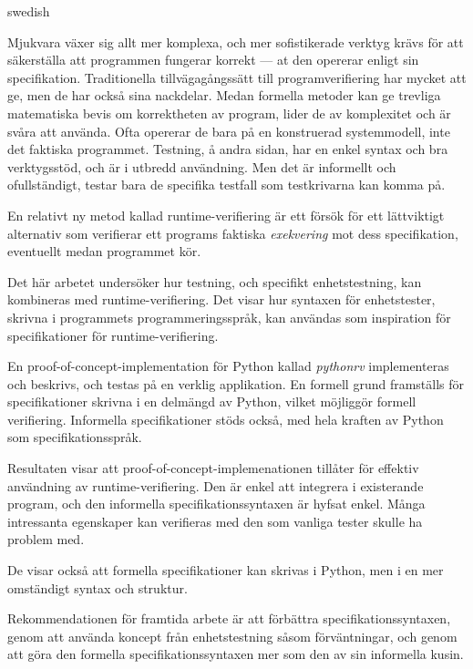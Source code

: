 \documentclass[a4paper,11pt]{kth-mag}
\begin{document}
\begin{foreignabstract}{swedish}

Mjukvara växer sig allt mer komplexa, och mer sofistikerade verktyg
krävs för att säkerställa att programmen fungerar korrekt --- at den opererar
enligt sin specifikation. Traditionella tillvägagångssätt till
programverifiering har mycket att ge, men de har också sina nackdelar. Medan
formella metoder kan ge trevliga matematiska bevis om korrektheten av program,
lider de av komplexitet och är svåra att använda. Ofta opererar de bara på en
konstruerad systemmodell, inte det faktiska programmet. Testning, å andra
sidan, har en enkel syntax och bra verktygsstöd, och är i utbredd användning.
Men det är informellt och ofullständigt, testar bara de specifika testfall som
testkrivarna kan komma på.

En relativt ny metod kallad runtime-verifiering är ett försök för ett
lättviktigt alternativ som verifierar ett programs faktiska \textit{exekvering}
mot dess specifikation, eventuellt medan programmet kör.

Det här arbetet undersöker hur testning, och specifikt enhetstestning, kan
kombineras med runtime-verifiering. Det visar hur syntaxen för enhetstester,
skrivna i programmets programmeringsspråk, kan användas som inspiration för
specifikationer för runtime-verifiering.

En proof-of-concept-implementation för Python kallad \textit{pythonrv}
implementeras och beskrivs, och testas på en verklig applikation. En formell
grund framställs för specifikationer skrivna i en delmängd av Python, vilket
möjliggör formell verifiering. Informella specifikationer stöds också, med hela
kraften av Python som specifikationsspråk.

Resultaten visar att proof-of-concept-implemenationen tillåter för effektiv
användning av runtime-verifiering. Den är enkel att integrera i existerande
program, och den informella specifikationssyntaxen är hyfsat enkel. Många
intressanta egenskaper kan verifieras med den som vanliga tester skulle ha
problem med.

De visar också att formella specifikationer kan skrivas i Python, men i en mer
omständigt syntax och struktur.

Rekommendationen för framtida arbete är att förbättra specifikationssyntaxen,
genom att använda koncept från enhetstestning såsom förväntningar, och genom
att göra den formella specifikationssyntaxen mer som den av sin informella
kusin.

\end{foreignabstract}
\clearpage
\end{document}
